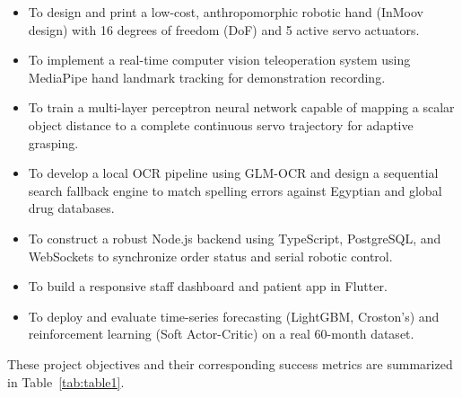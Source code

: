 \documentclass[12pt,a4paper,oneside]{report}
\begin{document}
\begin{itemize}
\item
  To design and print a low-cost, anthropomorphic robotic hand (InMoov
  design) with 16 degrees of freedom (DoF) and 5 active servo actuators.
\item
  To implement a real-time computer vision teleoperation system using
  MediaPipe hand landmark tracking for demonstration recording.
\item
  To train a multi-layer perceptron neural network capable of mapping a
  scalar object distance to a complete continuous servo trajectory for
  adaptive grasping.
\item
  To develop a local OCR pipeline using GLM-OCR and design a sequential
  search fallback engine to match spelling errors against Egyptian and
  global drug databases.
\item
  To construct a robust Node.js backend using TypeScript, PostgreSQL,
  and WebSockets to synchronize order status and serial robotic control.
\item
  To build a responsive staff dashboard and patient app in Flutter.
\item
  To deploy and evaluate time-series forecasting (LightGBM, Croston's)
  and reinforcement learning (Soft Actor-Critic) on a real 60-month
  dataset.
\end{itemize}

These project objectives and their corresponding success metrics are
summarized in Table~\ref{tab:table1}.
\end{document}
